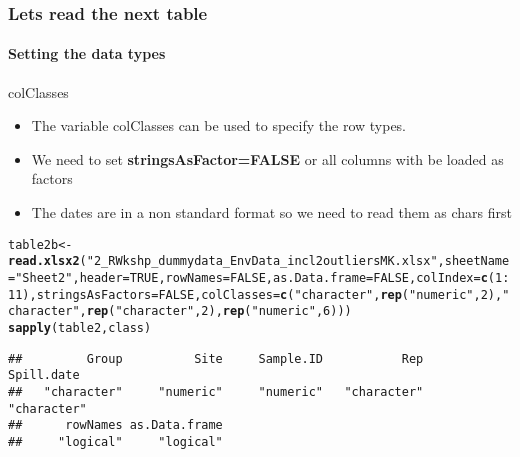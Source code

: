 \documentclass{article}\usepackage[]{graphicx}\usepackage[]{color}
\makeatletter
\newcommand{\hlnum}[1]{\textcolor[rgb]{0.686,0.059,0.569}{#1}}%
\newcommand{\hlstr}[1]{\textcolor[rgb]{0.192,0.494,0.8}{#1}}%
\newcommand{\hlopt}[1]{\textcolor[rgb]{0,0,0}{#1}}%
\newcommand{\hlstd}[1]{\textcolor[rgb]{0.345,0.345,0.345}{#1}}%
\newcommand{\hlkwb}[1]{\textcolor[rgb]{0.69,0.353,0.396}{#1}}%
\newcommand{\hlkwc}[1]{\textcolor[rgb]{0.333,0.667,0.333}{#1}}%
\newcommand{\hlkwd}[1]{\textcolor[rgb]{0.737,0.353,0.396}{\textbf{#1}}}%
\newenvironment{kframe}{%
 \def\at@end@of@kframe{}%
 \ifinner\ifhmode%
  \def\at@end@of@kframe{\end{minipage}}%
  \begin{minipage}{\columnwidth}%
 \fi\fi%
 \def\FrameCommand##1{\hskip\@totalleftmargin \hskip-\fboxsep
 \colorbox{shadecolor}{##1}\hskip-\fboxsep
     \hskip-\linewidth \hskip-\@totalleftmargin \hskip\columnwidth}%
 \MakeFramed {\advance\hsize-\width
   \@totalleftmargin\z@ \linewidth\hsize
   \@setminipage}}%
 {\par\unskip\endMakeFramed%
 \at@end@of@kframe}
\newenvironment{knitrout}{}{} %
\makeatother
\begin{document}
\begin{frame}[fragile]
  \frametitle{Lets read the next table}
  \framesubtitle{Setting the data types}
\begin{block}{colClasses}
\begin{itemize}
\item The variable colClasses can be used to specify the row types.
\item We need to set {\bf stringsAsFactor=FALSE} or all columns with be loaded as factors
\item The dates are in a non standard format so we need to read them as chars first
\end{itemize}
\end{block}

\begin{knitrout}
\color{fgcolor}\begin{kframe}
\begin{alltt}
\hlstd{table2b}\hlkwb{<-}\hlkwd{read.xlsx2}\hlstd{(}\hlstr{"2_R Wkshp_dummy data_Env Data_incl2outliersMK.xlsx"}\hlstd{,} \hlkwc{sheetName} \hlstd{=} \hlstr{"Sheet2"}\hlstd{,}\hlkwc{header}\hlstd{=}\hlnum{TRUE}\hlstd{,}\hlkwc{rowNames}\hlstd{=}\hlnum{FALSE}\hlstd{,}\hlkwc{as.Data.frame}\hlstd{=}\hlnum{FALSE}\hlstd{,}\hlkwc{colIndex}\hlstd{=}\hlkwd{c}\hlstd{(}\hlnum{1}\hlopt{:}\hlnum{11}\hlstd{),}\hlkwc{stringsAsFactors}\hlstd{=}\hlnum{FALSE}\hlstd{,}\hlkwc{colClasses}\hlstd{=}\hlkwd{c}\hlstd{(}\hlstr{"character"}\hlstd{,}\hlkwd{rep}\hlstd{(}\hlstr{"numeric"}\hlstd{,}\hlnum{2}\hlstd{),}\hlstr{"character"}\hlstd{,}\hlkwd{rep}\hlstd{(}\hlstr{"character"}\hlstd{,}\hlnum{2}\hlstd{),}\hlkwd{rep}\hlstd{(}\hlstr{"numeric"}\hlstd{,}\hlnum{6}\hlstd{)))}
\hlkwd{sapply}\hlstd{(table2,class)}
\end{alltt}
\begin{verbatim}
##         Group          Site     Sample.ID           Rep    Spill.date 
##   "character"     "numeric"     "numeric"   "character"   "character" 
##      rowNames as.Data.frame 
##     "logical"     "logical"
\end{verbatim}
\end{kframe}
\end{knitrout}
\clearpage
\end{frame}
\end{document}
